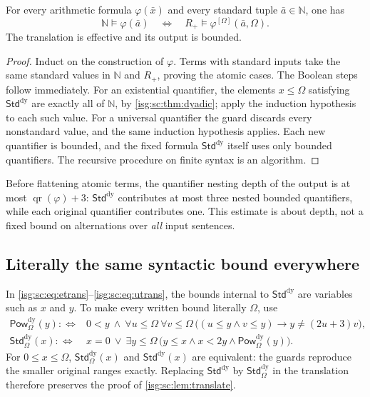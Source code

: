 \documentclass[11pt]{article}
\theoremstyle{definition}
\theoremstyle{remark}
\newcommand{\N}{\mathbb{N}}
\newcommand{\PowDy}{\mathsf{Pow}^{\mathrm{dy}}}
\newcommand{\StdDy}{\mathsf{Std}^{\mathrm{dy}}}
\newcommand{\rk}{\operatorname{qr}}
\begin{document}
\begin{lemma}\label{isg:sc:lem:translate}
For every arithmetic formula $\varphi(\bar x)$ and every standard tuple
$\bar a\in\N$, one has
\[
 \N\models\varphi(\bar a)
 \quad\Longleftrightarrow\quad
 R_+\models\varphi^{[\Omega]}(\bar a,\Omega).
\]
The translation is effective and its output is bounded.
\end{lemma}
\begin{proof}
Induct on the construction of $\varphi$. Terms with standard inputs take
the same standard values in $\N$ and $R_+$, proving the atomic cases. The
Boolean steps follow immediately. For an existential quantifier, the
elements $x\le\Omega$ satisfying $\StdDy$ are exactly all of $\N$, by
\cref{isg:sc:thm:dyadic}; apply the induction hypothesis to each such
value. For a universal quantifier the guard discards every nonstandard
value, and the same induction hypothesis applies. Each new quantifier is
bounded, and the fixed formula $\StdDy$ itself uses only bounded
quantifiers. The recursive procedure on finite syntax is an algorithm.
\end{proof}

Before flattening atomic terms, the quantifier nesting depth of the output
is at most $\rk(\varphi)+3$: $\StdDy$ contributes at most three nested
bounded quantifiers, while each original quantifier contributes one. This
estimate is about depth, not a fixed bound on alternations over \emph{all}
input sentences.

\subsection{Literally the same syntactic bound everywhere}
In \eqref{isg:sc:eq:etrans}--\eqref{isg:sc:eq:utrans}, the bounds internal
to $\StdDy$ are variables such as $x$ and $y$. To make every written bound
literally $\Omega$, use
\begin{align}
 \PowDy_\Omega(y):\Longleftrightarrow{}&0<y\ \wedge\
 \forall u\le\Omega\ \forall v\le\Omega\,
 \bigl((u\le y\wedge v\le y)\to y\ne(2u+3)v\bigr),\label{isg:sc:eq:PH}\\
 \StdDy_\Omega(x):\Longleftrightarrow{}&x=0\ \vee\
 \exists y\le\Omega\,
 \bigl(y\le x\wedge x<2y\wedge\PowDy_\Omega(y)\bigr).\label{isg:sc:eq:SH}
\end{align}
For $0\le x\le\Omega$, $\StdDy_\Omega(x)$ and $\StdDy(x)$ are equivalent:
the guards reproduce the smaller original ranges exactly. Replacing
$\StdDy$ by $\StdDy_\Omega$ in the translation therefore preserves the
proof of \cref{isg:sc:lem:translate}.
\end{document}
